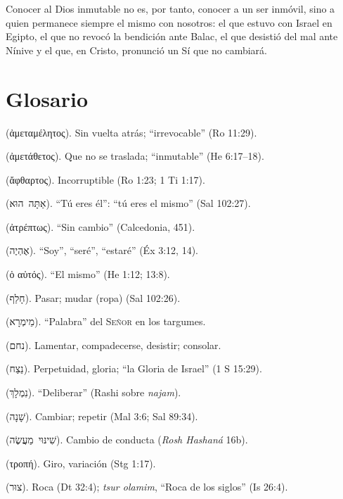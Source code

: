 \documentclass[11pt,letterpaper]{article}
\newcommand{\heb}[1]{\mbox{\foreignlanguage{hebrew}{#1}}}
\newcommand{\grc}[1]{\foreignlanguage{ancientgreek}{#1}}
\newcommand{\SENOR}{\textsc{Señor}}
\begin{document}
Conocer al Dios inmutable no es, por tanto, conocer a un ser inmóvil, sino a quien permanece siempre el mismo con nosotros: el que estuvo con Israel en Egipto, el que no revocó la bendición ante Balac, el que desistió del mal ante Nínive y el que, en Cristo, pronunció un Sí que no cambiará.

\section*{Glosario}
\begin{description}\setlength{\itemsep}{2pt}
\item[\emph{Ametamélētos}] (\grc{ἀμεταμέλητος}). Sin vuelta atrás; ``irrevocable'' (Ro 11:29).
\item[\emph{Ametáthetos}] (\grc{ἀμετάθετος}). Que no se traslada; ``inmutable'' (He 6:17--18).
\item[\emph{Áphthartos}] (\grc{ἄφθαρτος}). Incorruptible (Ro 1:23; 1 Ti 1:17).
\item[\emph{Atá hu}] (\heb{אַתָּה הוּא}). ``Tú eres él'': ``tú eres el mismo'' (Sal 102:27).
\item[\emph{Atréptōs}] (\grc{ἀτρέπτως}). ``Sin cambio'' (Calcedonia, 451).
\item[\emph{Ehyé}] (\heb{אֶהְיֶה}). ``Soy'', ``seré'', ``estaré'' (Éx 3:12, 14).
\item[\emph{Ho autós}] (\grc{ὁ αὐτός}). ``El mismo'' (He 1:12; 13:8).
\item[\emph{Jalaf}] (\heb{חָלַף}). Pasar; mudar (ropa) (Sal 102:26).
\item[\emph{Memrá}] (\heb{מֵימְרָא}). ``Palabra'' del \SENOR{} en los targumes.
\item[\emph{Najam}] (\heb{נחם}). Lamentar, compadecerse, desistir; consolar.
\item[\emph{Nétsaj}] (\heb{נֵצַח}). Perpetuidad, gloria; ``la Gloria de Israel'' (1 S 15:29).
\item[\emph{Nimlaj}] (\heb{נִמְלָךְ}). ``Deliberar'' (Rashi sobre \emph{najam}).
\item[\emph{Shaná}] (\heb{שָׁנָה}). Cambiar; repetir (Mal 3:6; Sal 89:34).
\item[\emph{Shinui maasé}] (\heb{שִׁינּוּי מַעֲשֶׂה}). Cambio de conducta (\emph{Rosh Hashaná} 16b).
\item[\emph{Tropé}] (\grc{τροπή}). Giro, variación (Stg 1:17).
\item[\emph{Tsur}] (\heb{צוּר}). Roca (Dt 32:4); \emph{tsur olamim}, ``Roca de los siglos'' (Is 26:4).
\end{description}
\end{document}
